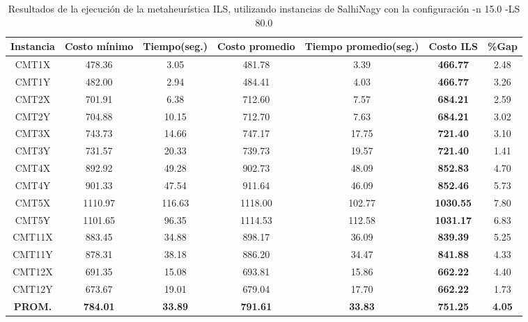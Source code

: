 \begin{table}[ht]
\caption{Resultados de la ejecución de la metaheurística ILS, utilizando instancias de SalhiNagy con la configuración -n 15.0 -LS 80.0}
\centering
\small
\begin{tabular}{c c c c c c c}
\hline\hline
Instancia & Costo mínimo & Tiempo(seg.) & Costo promedio & Tiempo promedio(seg.) & Costo ILS & \%Gap \\ [0.5ex]
\hline
CMT1X & 478.36 & 3.05 & 
481.78 & 3.39 & \bf{466.77} & 
2.48\\CMT1Y & 482.00 & 2.94 & 
484.41 & 4.03 & \bf{466.77} & 
3.26\\CMT2X & 701.91 & 6.38 & 
712.60 & 7.57 & \bf{684.21} & 
2.59\\CMT2Y & 704.88 & 10.15 & 
712.70 & 7.63 & \bf{684.21} & 
3.02\\CMT3X & 743.73 & 14.66 & 
747.17 & 17.75 & \bf{721.40} & 
3.10\\CMT3Y & 731.57 & 20.33 & 
739.73 & 19.57 & \bf{721.40} & 
1.41\\CMT4X & 892.92 & 49.28 & 
902.73 & 48.09 & \bf{852.83} & 
4.70\\CMT4Y & 901.33 & 47.54 & 
911.64 & 46.09 & \bf{852.46} & 
5.73\\CMT5X & 1110.97 & 116.63 & 
1118.00 & 102.77 & \bf{1030.55} & 
7.80\\CMT5Y & 1101.65 & 96.35 & 
1114.53 & 112.58 & \bf{1031.17} & 
6.83\\CMT11X & 883.45 & 34.88 & 
898.17 & 36.09 & \bf{839.39} & 
5.25\\CMT11Y & 878.31 & 38.18 & 
886.20 & 34.47 & \bf{841.88} & 
4.33\\CMT12X & 691.35 & 15.08 & 
693.81 & 15.86 & \bf{662.22} & 
4.40\\CMT12Y & 673.67 & 19.01 & 
679.04 & 17.70 & \bf{662.22} & 
1.73\\\bf{PROM.} & 
\bf{784.01} & \bf{33.89} & \bf{791.61} & \bf{33.83} & \bf{751.25} & \bf{4.05}\\[1ex]\hline
\end{tabular}
\label{table:nonlin}
\end{table} \clearpage
